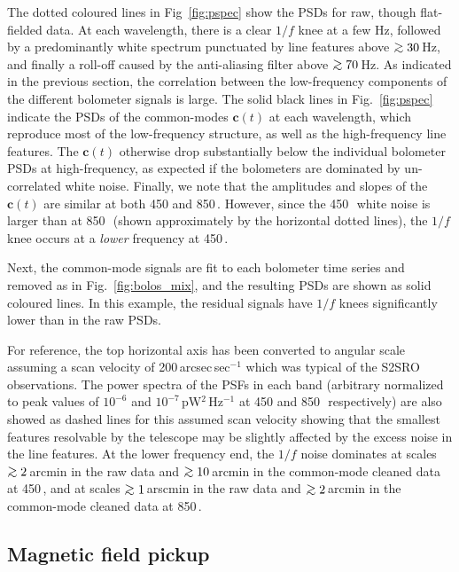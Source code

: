\documentclass[useAMS,usenatbib,nofootinbib]{mn2e}
\def\gsim{\mathrel{\lower2.5pt\vbox{\lineskip=0pt\baselineskip=0pt
          \hbox{$>$}\hbox{$\sim$}}}}
\begin{document}
The dotted coloured lines in Fig~\ref{fig:pspec} show the PSDs for
raw, though flat-fielded data. At each wavelength, there is a clear
$1/f$ knee at a few Hz, followed by a predominantly white spectrum
punctuated by line features above $\gsim 30$\,Hz, and finally a
roll-off caused by the anti-aliasing filter above $\gsim 70$\,Hz. As
indicated in the previous section, the correlation between the
low-frequency components of the different bolometer signals is
large. The solid black lines in Fig.~\ref{fig:pspec} indicate the PSDs
of the common-modes $\mathbf{c}(t)$ at each wavelength, which
reproduce most of the low-frequency structure, as well as the
high-frequency line features. The $\mathbf{c}(t)$ otherwise drop
substantially below the individual bolometer PSDs at high-frequency,
as expected if the bolometers are dominated by un-correlated white
noise. Finally, we note that the amplitudes and slopes of the
$\mathbf{c}(t)$ are similar at both 450 and 850\,\micron. However,
since the 450\,\micron\ white noise is larger than at 850\,\micron\
(shown approximately by the horizontal dotted lines), the $1/f$ knee
occurs at a \emph{lower} frequency at 450\,\micron.

Next, the common-mode signals are fit to each bolometer time series
and removed as in Fig.~\ref{fig:bolos_mix}, and the resulting PSDs are
shown as solid coloured lines. In this example, the residual signals
have $1/f$ knees significantly lower than in the raw PSDs.

For reference, the top horizontal axis has been converted to angular
scale assuming a scan velocity of 200\,arcsec\,sec$^{-1}$ which was
typical of the S2SRO observations. The power spectra of the PSFs in
each band (arbitrary normalized to peak values of $10^{-6}$ and
$10^{-7}$\,pW$^2$\,Hz$^{-1}$ at 450 and 850\,\micron\ respectively)
are also showed as dashed lines for this assumed scan velocity showing
that the smallest features resolvable by the telescope may be slightly
affected by the excess noise in the line features. At the lower
frequency end, the $1/f$ noise dominates at scales $\gsim 2$\,arcmin
in the raw data and $\gsim 10$\,arcmin in the common-mode cleaned data
at 450\,\micron, and at scales $\gsim 1$\,arscmin in the raw data and
$\gsim 2$\,arcmin in the common-mode cleaned data at 850\,\micron.

\subsection{Magnetic field pickup}
\label{sec:magpickup}
\end{document}
